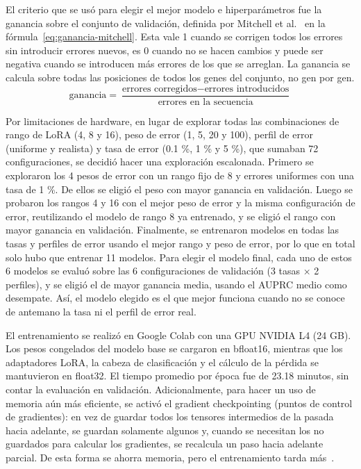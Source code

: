 \documentclass[sigconf,nonacm]{acmart}
\begin{document}
El criterio que se usó para elegir el mejor modelo e hiperparámetros fue la ganancia sobre el conjunto de validación, definida por Mitchell et al.~\cite{mitchell2020benchmarking} en la fórmula~\eqref{eq:ganancia-mitchell}. Esta vale 1 cuando se corrigen todos los errores sin introducir errores nuevos, es 0 cuando no se hacen cambios y puede ser negativa cuando se introducen más errores de los que se arreglan. La ganancia se calcula sobre todas las posiciones de todos los genes del conjunto, no gen por gen.
\begin{equation}\label{eq:ganancia-mitchell}
\mathrm{ganancia} = \frac{\text{errores corregidos} - \text{errores introducidos}}{\text{errores en la secuencia}}
\end{equation}

Por limitaciones de hardware, en lugar de explorar todas las combinaciones de rango de LoRA (4, 8 y 16), peso de error (1, 5, 20 y 100), perfil de error (uniforme y realista) y tasa de error (0.1 \%, 1 \% y 5 \%), que sumaban 72 configuraciones, se decidió hacer una exploración escalonada. Primero se exploraron los 4 pesos de error con un rango fijo de 8 y errores uniformes con una tasa de 1 \%. De ellos se eligió el peso con mayor ganancia en validación. Luego se probaron los rangos 4 y 16 con el mejor peso de error y la misma configuración de error, reutilizando el modelo de rango 8 ya entrenado, y se eligió el rango con mayor ganancia en validación. Finalmente, se entrenaron modelos en todas las tasas y perfiles de error usando el mejor rango y peso de error, por lo que en total solo hubo que entrenar 11 modelos. Para elegir el modelo final, cada uno de estos 6 modelos se evaluó sobre las 6 configuraciones de validación (3 tasas × 2 perfiles), y se eligió el de mayor ganancia media, usando el AUPRC medio como desempate. Así, el modelo elegido es el que mejor funciona cuando no se conoce de antemano la tasa ni el perfil de error real.

El entrenamiento se realizó en Google Colab con una GPU NVIDIA L4 (24 GB). Los pesos congelados del modelo base se cargaron en bfloat16, mientras que los adaptadores LoRA, la cabeza de clasificación y el cálculo de la pérdida se mantuvieron en float32. El tiempo promedio por época fue de 23.18 minutos, sin contar la evaluación en validación. Adicionalmente, para hacer un uso de memoria aún más eficiente, se activó el gradient checkpointing (puntos de control de gradientes): en vez de guardar todos los tensores intermedios de la pasada hacia adelante, se guardan solamente algunos y, cuando se necesitan los no guardados para calcular los gradientes, se recalcula un paso hacia adelante parcial. De esta forma se ahorra memoria, pero el entrenamiento tarda más~\cite{pytorch_checkpoint}.
\end{document}
